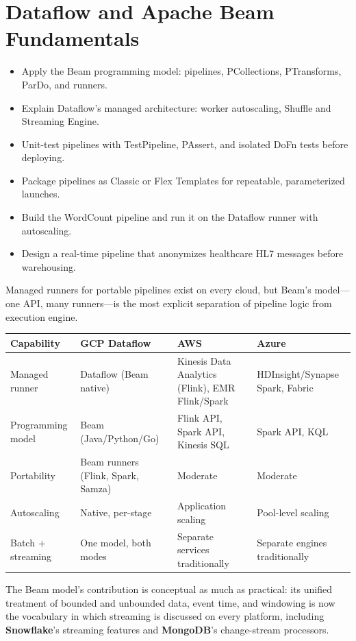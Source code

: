 \chapter{Dataflow and Apache Beam Fundamentals}

\begin{objectives}
\begin{itemize}
    \item Apply the Beam programming model: pipelines, PCollections, PTransforms, ParDo, and runners.
    \item Explain Dataflow's managed architecture: worker autoscaling, Shuffle and Streaming Engine.
    \item Unit-test pipelines with TestPipeline, PAssert, and isolated DoFn tests before deploying.
    \item Package pipelines as Classic or Flex Templates for repeatable, parameterized launches.
    \item Build the WordCount pipeline and run it on the Dataflow runner with autoscaling.
    \item Design a real-time pipeline that anonymizes healthcare HL7 messages before warehousing.
\end{itemize}
\end{objectives}

\begin{crosscloud}
Managed runners for portable pipelines exist on every cloud, but Beam's model---one API, many runners---is the most explicit separation of pipeline logic from execution engine.

\vspace{2mm}
{\footnotesize
\begin{tabular}{@{}p{2.8cm}p{3.0cm}p{3.0cm}p{3.0cm}@{}} \\
\toprule
\textbf{Capability} & \textbf{GCP Dataflow} & \textbf{AWS} & \textbf{Azure} \\
\midrule
Managed runner & Dataflow (Beam native) & Kinesis Data Analytics (Flink), EMR Flink/Spark & HDInsight/Synapse Spark, Fabric \\
Programming model & Beam (Java/Python/Go) & Flink API, Spark API, Kinesis SQL & Spark API, KQL \\
Portability & Beam runners (Flink, Spark, Samza) & Moderate & Moderate \\
Autoscaling & Native, per-stage & Application scaling & Pool-level scaling \\
Batch + streaming & One model, both modes & Separate services traditionally & Separate engines traditionally \\
\bottomrule
\end{tabular}}

\vspace{1mm}
The Beam model's contribution is conceptual as much as practical: its unified treatment of bounded and unbounded data, event time, and windowing \cite{akidau2015dataflow} is now the vocabulary in which streaming is discussed on every platform, including \textbf{Snowflake}'s streaming features and \textbf{MongoDB}'s change-stream processors.
\end{crosscloud}

